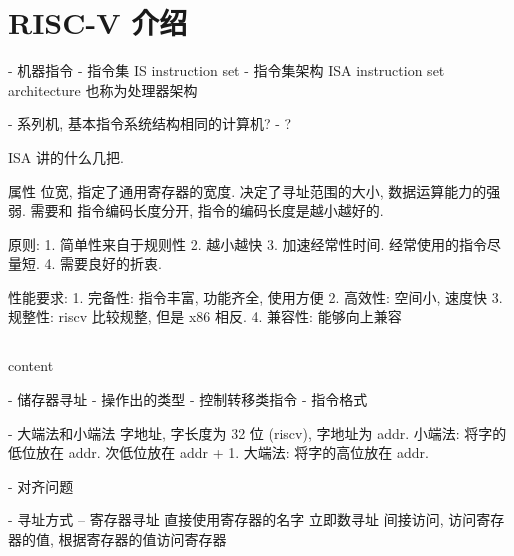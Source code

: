 \documentclass[12pt]{ctexart}
\theoremstyle{definition}
\theoremstyle{definition}
\theoremstyle{plain}
\begin{document}
\section{RISC-V 介绍}

- 机器指令 
- 指令集 IS instruction set
- 指令集架构 ISA instruction set architecture 
也称为处理器架构

- 系列机, 基本指令系统结构相同的计算机? 
- ? 

ISA 
讲的什么几把. 

属性 
位宽, 指定了通用寄存器的宽度. 决定了寻址范围的大小, 数据运算能力的强弱. 
需要和 指令编码长度分开, 指令的编码长度是越小越好的. 

原则:
1. 简单性来自于规则性
2. 越小越快
3. 加速经常性时间.  经常使用的指令尽量短. 
4. 需要良好的折衷.

性能要求: 
1. 完备性: 指令丰富, 功能齐全, 使用方便
2. 高效性: 空间小, 速度快
3. 规整性: riscv 比较规整, 但是 x86 相反. 
4. 兼容性: 能够向上兼容
 
\subsection{}

content

- 储存器寻址
- 操作出的类型
- 控制转移类指令
- 指令格式

- 大端法和小端法
字地址, 字长度为 32 位 (riscv), 字地址为 addr.
小端法: 将字的低位放在 addr. 次低位放在 addr + 1.
大端法: 将字的高位放在 addr. 

- 对齐问题

- 寻址方式
-- 寄存器寻址
直接使用寄存器的名字
立即数寻址
间接访问, 访问寄存器的值, 根据寄存器的值访问寄存器
\end{document}
